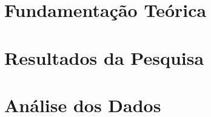 \documentclass
[
  12pt,      %
  openright, %
  twoside,   %
  a4paper,   %
  brazil     %
]{cls/tccUFRB}
\begin{document}
  

  \textual 

  

  \part{Fundamentação Teórica}
    
  \part{Resultados da Pesquisa}
  \part{Análise dos Dados}

% 
  

  \postextual

  \nocite{*}
  \printbibliography

\end{document}
